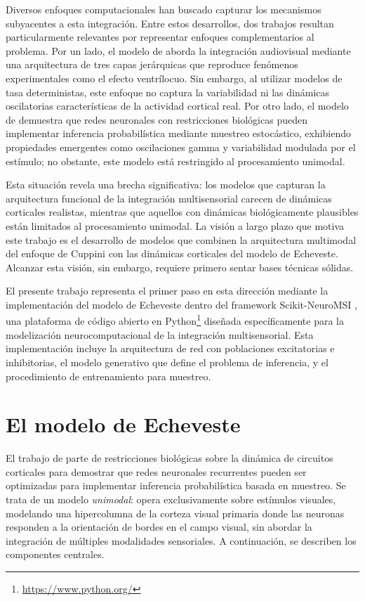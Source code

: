 \documentclass{llncs}
\begin{document}
Diversos enfoques computacionales han buscado capturar los mecanismos
subyacentes a esta integración. Entre estos desarrollos, dos trabajos
resultan particularmente relevantes por representar enfoques
complementarios al problema. Por un lado, el modelo de
\citet{cuppini2017biologically} aborda la integración audiovisual
mediante una arquitectura de tres capas jerárquicas que reproduce
fenómenos experimentales como el efecto ventrílocuo. Sin embargo, al
utilizar modelos de tasa deterministas, este enfoque no captura la
variabilidad ni las dinámicas oscilatorias características de la
actividad cortical real. Por otro lado, el modelo de
\citet{echeveste2020cortical} demuestra que redes neuronales con
restricciones biológicas pueden implementar inferencia probabilística
mediante muestreo estocástico, exhibiendo propiedades emergentes como
oscilaciones gamma y variabilidad modulada por el estímulo; no
obstante, este modelo está restringido al procesamiento unimodal.

Esta situación revela una brecha significativa: los modelos que
capturan la arquitectura funcional de la integración multisensorial
carecen de dinámicas corticales realistas, mientras que aquellos con
dinámicas biológicamente plausibles están limitados al procesamiento
unimodal. La visión a largo plazo que motiva este trabajo es el
desarrollo de modelos que combinen la arquitectura multimodal del
enfoque de Cuppini con las dinámicas corticales del modelo de
Echeveste. Alcanzar esta visión, sin embargo, requiere primero sentar
bases técnicas sólidas.

El presente trabajo representa el primer paso en esta dirección
mediante la implementación del modelo de Echeveste dentro del
framework Scikit-NeuroMSI \citep{paredes2025scikit}, una plataforma
de código abierto en Python\footnote{\url{https://www.python.org/}}
diseñada específicamente para la modelización neurocomputacional de
la integración multisensorial. Esta implementación incluye la
arquitectura de red con poblaciones excitatorias e inhibitorias, el
modelo generativo que define el problema de inferencia, y el
procedimiento de entrenamiento para muestreo.

\section{El modelo de Echeveste}

El trabajo de \citet{echeveste2020cortical} parte de restricciones
biológicas sobre la dinámica de circuitos corticales para demostrar
que redes neuronales recurrentes pueden ser optimizadas para
implementar inferencia probabilística basada en muestreo. Se trata
de un modelo \emph{unimodal}: opera exclusivamente sobre estímulos
visuales, modelando una hipercolumna de la corteza visual primaria
donde las neuronas responden a la orientación de bordes en el campo
visual, sin abordar la integración de múltiples modalidades
sensoriales. A continuación, se describen los componentes centrales.
\end{document}
